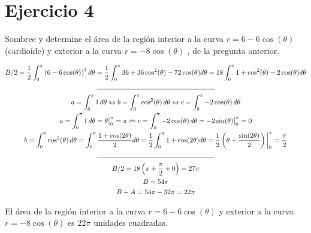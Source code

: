 \section*{Ejercicio 4}
\noindent Sombree y determine el área de la región interior a la curva \(r = 6 - 6 \cos(\theta)\) (cardioide) y exterior a la
curva \(r = -8\cos(\theta)\) , de la pregunta anterior.

\begin{gather*}
  B / 2 = \frac{1}{2} \int_{0}^{\pi} \left(6 - 6\cos(\theta)\right)^2 d\theta %
    = \frac{1}{2} \int_{0}^{\pi} 36 + 36\cos^2(\theta) - 72\cos(\theta) d\theta %
    = 18 \int_{0}^{\pi} 1 + \cos^2(\theta) - 2\cos(\theta) d\theta \\
  \rule{0.5\textwidth}{0.4pt} \\
  a = \int_{0}^{\pi} 1 \, d\theta \Leftrightarrow %
    b = \int_{0}^{\pi} \cos^2(\theta) \, d\theta \Leftrightarrow %
    c = \int_{0}^{\pi} -2\cos(\theta) \, d\theta \\
  a = \int_{0}^{\pi} 1 \, d\theta = \theta \big|_{0}^{\pi} = \pi \Leftrightarrow %
    c = \int_{0}^{\pi} -2\cos(\theta) \, d\theta = -2 \sin(\theta) \big|_{0}^{\pi} = 0 \\
  b = \int_{0}^{\pi} \cos^2(\theta) \, d\theta %
    = \int_{0}^{\pi} \frac{1 + \cos(2\theta)}{2} d\theta %
    = \frac{1}{2} \int_{0}^{\pi} 1 + \cos(2\theta) d\theta %
    = \frac{1}{2} \left(\theta + \frac{\sin(2\theta)}{2}\right) \bigg|_{0}^{\pi} %
    = \frac{\pi}{2} \\
  \rule{0.5\textwidth}{0.4pt} \\
  B / 2 = 18 \left(\pi + \frac{\pi}{2} + 0\right) = 27 \pi \\
  B = 54 \pi \\
  B - A = 54 \pi - 32 \pi = 22 \pi
\end{gather*}

\noindent El área de la región interior a la curva \(r = 6 - 6 \cos(\theta)\) y exterior a la curva \(r = -8\cos(\theta)\) es \(22 \pi\) unidades cuadradas.

\newpage